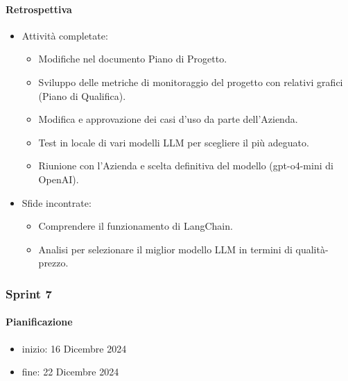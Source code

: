 \documentclass{article}
\begin{document}
                \paragraph{Retrospettiva}
                \begin{itemize}
                    \item Attività completate:
                    \begin{itemize}
                        \item Modifiche nel documento Piano di Progetto.
                        \item Sviluppo delle metriche di monitoraggio del progetto con relativi grafici (Piano di Qualifica).
                        \item Modifica e approvazione dei casi d'uso da parte dell'Azienda.
                        \item Test in locale di vari modelli LLM per scegliere il più adeguato.
                        \item Riunione con l'Azienda e scelta definitiva del modello (gpt-o4-mini di OpenAI).
                    \end{itemize}
                    \item Sfide incontrate:
                    \begin{itemize}
                        \item Comprendere il funzionamento di LangChain.
                        \item Analisi per selezionare il miglior modello LLM in termini di qualità-prezzo.
                    \end{itemize}
                \end{itemize}
            \subsubsection{Sprint 7}
                \paragraph{Pianificazione}
                \begin{itemize}
                    \item inizio: 16 Dicembre 2024
                    \item fine: 22 Dicembre 2024
                \end{itemize}
\end{document}
